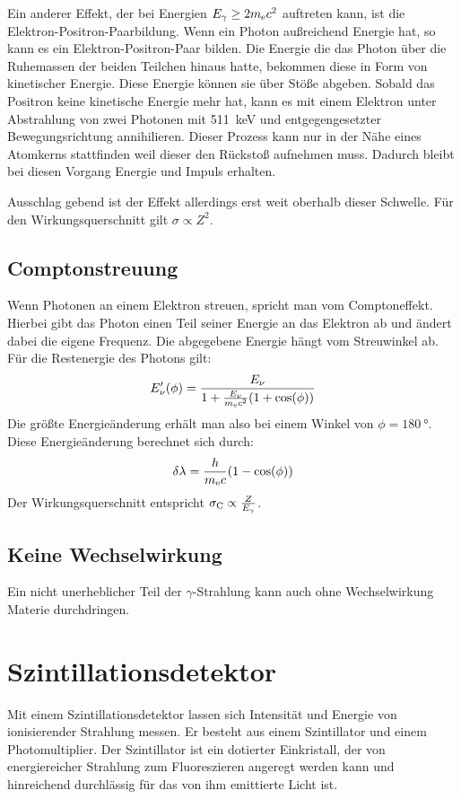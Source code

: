 \documentclass[11pt, ngerman, fleqn, DIV=15, headinclude, BCOR=2cm]{scrreprt}
\begin{document}
Ein anderer Effekt, der bei Energien $E_\gamma \ge 2m_\text ec^2$ auftreten
kann, ist die Elektron-Positron-Paarbildung. Wenn ein Photon außreichend
Energie hat, so kann es ein Elektron-Positron-Paar bilden. Die Energie die das
Photon über die Ruhemassen der beiden Teilchen hinaus hatte, bekommen diese in
Form von kinetischer Energie. Diese Energie können sie über Stöße abgeben.
Sobald das Positron keine kinetische Energie mehr hat, kann es mit einem
Elektron unter Abstrahlung von zwei Photonen mit \SI{511}{\kilo\electronvolt}
und entgegengesetzter Bewegungsrichtung annihilieren. Dieser Prozess kann nur in der Nähe eines Atomkerns stattfinden weil dieser
den Rückstoß aufnehmen muss.
Dadurch bleibt bei diesen Vorgang Energie und Impuls erhalten.

Ausschlag gebend ist der Effekt allerdings erst weit oberhalb dieser Schwelle.
Für den Wirkungsquerschnitt gilt $\sigma \propto Z^2$.

\subsection{Comptonstreuung}
Wenn Photonen an einem Elektron streuen, spricht man vom Comptoneffekt. 
Hierbei gibt das Photon einen Teil seiner Energie an das Elektron ab und ändert dabei
die eigene Frequenz.
Die abgegebene Energie hängt vom Streuwinkel ab.
Für die Restenergie des Photons gilt:
\[
    E_\nu'(\phi) = \frac{E_\nu}{1+\frac{E_\nu}{m_\text ec^2}(1+\cos(\phi))}
\]
Die größte Energieänderung erhält man also bei einem Winkel von
$\phi=\SI{180}{\degree}$.
Diese Energieänderung berechnet sich durch:
\[
    \delta\lambda = \frac{h}{m_\text ec}(1-\cos(\phi))
\]
Der Wirkungsquerschnitt entspricht $\sigma_\text C \propto \frac{Z}{E_\gamma}$.

\subsection{Keine Wechselwirkung}
Ein nicht unerheblicher Teil der $\gamma$-Strahlung kann auch ohne Wechselwirkung
Materie durchdringen.

\section{Szintillationsdetektor}

Mit einem Szintillationsdetektor lassen sich Intensität und Energie von
ionisierender Strahlung messen.
Er besteht aus einem Szintillator und einem Photomultiplier.
Der Szintillator ist ein dotierter Einkristall, der von energiereicher
Strahlung zum Fluoreszieren angeregt werden kann und hinreichend
durchlässig für das von ihm emittierte Licht ist.
\end{document}
